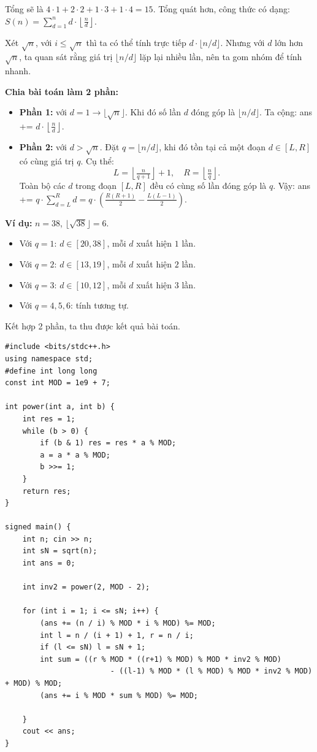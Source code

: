 Tổng sẽ là $4\cdot 1 + 2\cdot 2 + 1\cdot 3 + 1\cdot 4 = 15$.  
Tổng quát hơn, công thức có dạng: $S(n) = \sum_{d=1}^n d \cdot \left\lfloor \tfrac{n}{d} \right\rfloor.$

\medskip
Xét $\sqrt{n}$, với $i \leq \sqrt{n}$ thì ta có thể tính trực tiếp $d \cdot \lfloor n/d \rfloor$.  
Nhưng với $d$ lớn hơn $\sqrt{n}$, ta quan sát rằng giá trị $\lfloor n/d \rfloor$ lặp lại nhiều lần, nên ta gom nhóm để tính nhanh.

\textbf{Chia bài toán làm 2 phần:}  

\begin{itemize}
    \item \textbf{Phần 1:} với $d=1 \to \lfloor \sqrt{n}\rfloor$.  
    Khi đó số lần $d$ đóng góp là $\lfloor n/d \rfloor$. Ta cộng: ans += $d \cdot \left\lfloor \tfrac{n}{d} \right\rfloor.$

    \item \textbf{Phần 2:} với $d > \sqrt{n}$.  
    Đặt $q = \lfloor n/d \rfloor$, khi đó tồn tại cả một đoạn $d \in [L, R]$ có cùng giá trị $q$.  
    Cụ thể:
    \[
    L = \left\lfloor \tfrac{n}{q+1}\right\rfloor + 1,\quad R = \left\lfloor \tfrac{n}{q}\right\rfloor.
    \]
    Toàn bộ các $d$ trong đoạn $[L, R]$ đều có cùng số lần đóng góp là $q$. Vậy: ans += $q \cdot \sum_{d=L}^{R} d = q \cdot \left( \tfrac{R(R+1)}{2} - \tfrac{L(L-1)}{2} \right).$
\end{itemize}

\medskip
\textbf{Ví dụ:} $n=38$, $\lfloor \sqrt{38} \rfloor = 6$.  
\begin{itemize}
    \item Với $q=1$: $d \in [20,38]$, mỗi $d$ xuất hiện $1$ lần.
    \item Với $q=2$: $d \in [13,19]$, mỗi $d$ xuất hiện $2$ lần.
    \item Với $q=3$: $d \in [10,12]$, mỗi $d$ xuất hiện $3$ lần.
    \item Với $q=4,5,6$: tính tương tự.
\end{itemize}

Kết hợp 2 phần, ta thu được kết quả bài toán.

\begin{lstlisting}[title=\centering \textbf{Cài đặt}]
#include <bits/stdc++.h>
using namespace std;
#define int long long
const int MOD = 1e9 + 7;

int power(int a, int b) {
    int res = 1;
    while (b > 0) {
        if (b & 1) res = res * a % MOD;
        a = a * a % MOD;
        b >>= 1;
    }
    return res;
}

signed main() {
    int n; cin >> n;
    int sN = sqrt(n);
    int ans = 0;

    int inv2 = power(2, MOD - 2);

    for (int i = 1; i <= sN; i++) {
        (ans += (n / i) % MOD * i % MOD) %= MOD;
        int l = n / (i + 1) + 1, r = n / i;
        if (l <= sN) l = sN + 1;
        int sum = ((r % MOD * ((r+1) % MOD) % MOD * inv2 % MOD)
                        - ((l-1) % MOD * (l % MOD) % MOD * inv2 % MOD) + MOD) % MOD;
        (ans += i % MOD * sum % MOD) %= MOD;
        
    }
    cout << ans;
}
\end{lstlisting}
    

